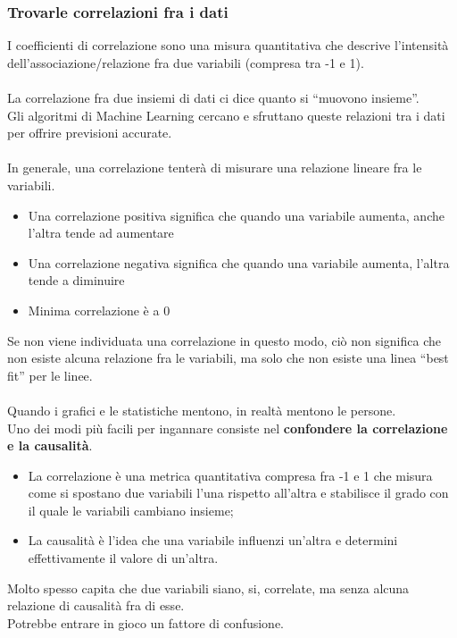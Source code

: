 \documentclass[../main.tex]{subfiles}
\begin{document}
	\subsubsection{Trovarle correlazioni fra i dati}
	I coefficienti di correlazione sono una misura quantitativa che descrive l’intensità dell’associazione/relazione fra due variabili (compresa tra -1 e 1).\\\\
	La correlazione fra due insiemi di dati ci dice quanto si “muovono insieme”. \\
	Gli algoritmi di Machine Learning cercano e sfruttano queste relazioni tra i dati per offrire previsioni accurate.\\\\
	In generale, una correlazione tenterà di misurare una relazione lineare fra le variabili.
	\begin{itemize}
		\item Una correlazione positiva significa che quando una variabile aumenta, anche l’altra tende ad aumentare
		\item Una correlazione negativa significa che quando una variabile aumenta, l’altra tende a diminuire
		\item Minima correlazione è a 0
	\end{itemize}
	Se non viene individuata una correlazione in questo modo, ciò non significa che non esiste alcuna relazione fra le variabili, ma solo che non esiste una linea “best fit” per le linee.\\\\
	Quando i grafici e le statistiche mentono, in realtà mentono le persone. \\
	Uno dei modi più facili per ingannare consiste nel \textbf{confondere la correlazione e la causalità}.
	\begin{itemize}
		\item La correlazione è una metrica quantitativa compresa fra -1 e 1 che misura come si spostano due variabili l’una rispetto all'altra e stabilisce il grado con il quale le variabili cambiano insieme;
		\item La causalità è l’idea che una variabile influenzi un’altra e determini effettivamente il valore di un’altra.
	\end{itemize}
	Molto spesso capita che due variabili siano, si, correlate, ma senza alcuna relazione di causalità fra di esse. \\
	Potrebbe entrare in gioco un fattore di confusione.\\\\
\end{document}
